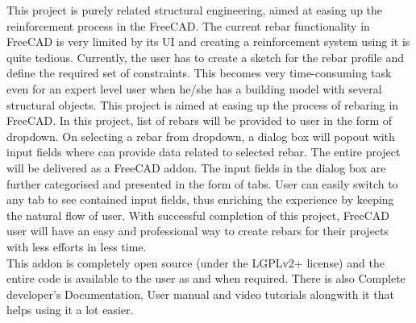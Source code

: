 This project is purely related structural engineering, aimed at easing up the reinforcement process in the FreeCAD. The current rebar functionality in FreeCAD is very limited by its UI and creating a reinforcement system using it is quite tedious. Currently, the user has to create a sketch for the rebar profile and define the required set of constraints. This becomes very time-consuming task even for an expert level user when he/she has a building model with several structural objects. This project is aimed at easing up the process of rebaring in FreeCAD. In this project, list of rebars will be provided to user in the form of dropdown. On selecting a rebar from dropdown, a dialog box will popout with input fields where can provide data related to selected rebar. The entire project will be delivered as a FreeCAD addon. The input fields in the dialog box are further categorised and presented in the form of tabs. User can easily switch to any tab to see contained input fields, thus enriching the experience by keeping the natural flow of user. With successful completion of this project, FreeCAD user will have an easy and professional way to create rebars for their projects with less efforts in less time.\\

This addon is completely open source (under the LGPLv2+ license) and the entire code is available to the user as and when
required. There is also Complete developer’s Documentation, User manual and video tutorials alongwith it that helps using it a lot easier.

